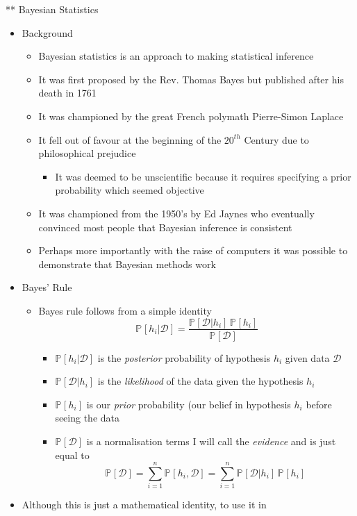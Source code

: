 \documentclass[11pt]{article}
\newcommand{\Prob}[2][]{\mathbb{P}_{#1\!}\left[ #2 \right]}
\begin{document}
** Bayesian Statistics
\begin{itemize}
\item Background
\begin{itemize}
\item Bayesian statistics is an approach to making statistical inference
\item It was first proposed by the Rev. Thomas Bayes but published after his death in 1761
\item It was championed by the great French polymath Pierre-Simon Laplace
\item It fell out of favour at the beginning of the \(20^{th}\) Century due to philosophical prejudice
\begin{itemize}
\item It was deemed to be unscientific because it requires specifying
a prior probability which seemed objective
\end{itemize}
\item It was championed from the 1950's by Ed Jaynes who eventually
convinced most people that Bayesian inference is consistent
\item Perhaps more importantly with the raise of computers it was
possible to demonstrate that Bayesian methods work
\end{itemize}
\item Bayes' Rule
\begin{itemize}
\item Bayes rule follows from a simple identity
$$ \Prob{h_i|\mathcal{D}} =
        \frac{\Prob{\mathcal{D}|h_i}\,\Prob{h_i}}{\Prob{\mathcal{D}}} $$
\begin{itemize}
\item \(\Prob{h_i|\mathcal{D}}\) is the \emph{posterior} probability of
hypothesis \(h_i\) given data \(\mathcal{D}\)
\item \(\Prob{\mathcal{D}|h_i}\) is the \emph{likelihood} of the data
given the hypothesis \(h_i\)
\item \(\Prob{h_i}\) is our \emph{prior} probability (our belief in
hypothesis \(h_i\) before seeing the data
\item \(\Prob{\mathcal{D}}\) is a normalisation terms I will call the
\emph{evidence} and is just equal to
$$ \Prob{\mathcal{D}} = \sum_{i=1}^n\Prob{h_i,\mathcal{D}}
          = \sum_{i=1}^n \Prob{\mathcal{D}|h_i} \,\Prob{h_i} $$
\end{itemize}
\end{itemize}
\item Although this is just a mathematical identity, to use it in

\end{itemize}
\end{document}
